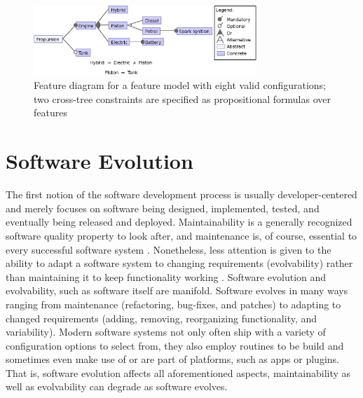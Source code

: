 \begin{figure}[htbp]
  \centering
  
  	\includegraphics[width=0.75\textwidth]{images/introduction_fm.eps}
  \caption{Feature diagram for a feature model with eight valid configurations;
  two cross-tree constraints are specified as propositional formulas over
  features}
  \label{fig:introduction_fm}
\end{figure}

\section{Software Evolution} \label{sec:evolving_solftware}
The first notion of the software development process is usually
developer-centered and merely focuses on software being designed, implemented,
tested, and eventually being released and deployed.
Maintainability is a generally recognized software quality
property to look after, and maintenance is, of course, essential to every
successful software system \cite{liggesmeyer_software-qualitat:_2009}. Nonetheless, less attention is given to
the ability to adapt a software system to changing requirements (evolvability) rather than maintaining it to keep functionality
working \citep{parnas_software_1994}. Software evolution and evolvability, such
as software itself are manifold. Software evolves in many ways ranging from
maintenance (refactoring, bug-fixes, and patches) to adapting to changed
requirements (adding, removing, reorganizing functionality, and variability).
Modern software systems not only often ship with a variety of configuration
options to select from, they also employ routines to be build and sometimes even
make use of or are part of platforms, such as apps or plugins. That is,
software evolution affects all aforementioned aspects, maintainability as
well as evolvability can degrade as software evolves.

